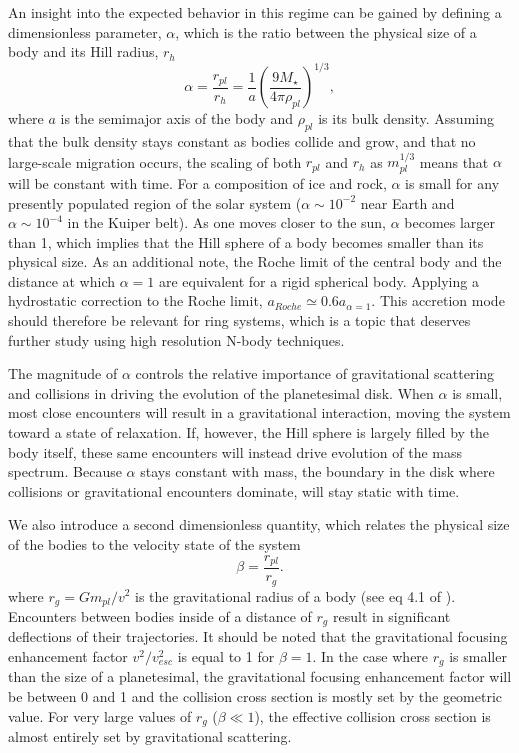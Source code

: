 An insight into the expected behavior in this regime can be gained by
defining a dimensionless parameter, $\alpha$, which is the ratio
between the physical size of a body and its Hill radius, $r_{h}$
\begin{equation}\label{eq:alpha}
	\alpha = \frac{r_{pl}}{r_{h}} = \frac{1}{a} \left( \frac{9 M_{\star}}{4 \pi \rho_{pl}} \right)^{1/3},
\end{equation}
where $a$ is the semimajor axis of the body and $\rho_{pl}$ is its
bulk density. Assuming that the bulk density stays constant as bodies collide and
grow, and that no large-scale migration occurs, the scaling of both
$r_{pl}$ and $r_{h}$ as $m_{pl}^{1/3}$ means that $\alpha$ will be
constant with time. For a composition of ice and rock, $\alpha$ is
small for any presently populated region of the solar system ($\alpha \sim
10^{-2}$ near Earth and $\alpha \sim 10^{-4}$ in the Kuiper belt). As
one moves closer to the sun, $\alpha$ becomes larger than 1, which
implies that the Hill sphere of a body becomes smaller than its physical size.
As an additional note, the Roche limit of the central body and the distance at which $\alpha = 1$ are equivalent for a rigid spherical body. Applying a hydrostatic correction to the Roche limit, $a_{Roche} \simeq 0.6 a_{\alpha = 1}$. This accretion mode should therefore be relevant for ring systems, which is a topic that deserves further study using high resolution N-body techniques.

The magnitude of $\alpha$ controls the relative importance of gravitational scattering and collisions in driving the evolution of the planetesimal disk. When $\alpha$ is small, most close encounters will result in a gravitational interaction, moving the system toward a state of relaxation. If, however, the Hill sphere is largely filled by the body itself, these same encounters will instead drive evolution of the mass spectrum. Because $\alpha$ stays constant with mass, the boundary in the disk where collisions or gravitational encounters dominate, will stay static with time.

We also introduce a second dimensionless quantity, which relates the physical size of the bodies to the velocity state of the system
\begin{equation}\label{eq:beta}
	\beta = \frac{r_{pl}}{r_{g}}.
\end{equation}
where $r_{g} = G m_{pl} / v^{2}$ is the gravitational radius of a body (see eq 4.1 of \cite{ida90}). Encounters between bodies inside of a distance of $r_{g}$ result in significant deflections of their trajectories. It should be noted that the gravitational focusing enhancement factor $v^{2}/v_{esc}^{2}$ is equal to 1 for $\beta = 1$. In the case where $r_{g}$ is smaller than the size of a planetesimal, the gravitational focusing enhancement factor will be between 0 and 1 and the collision cross section is mostly set by the geometric value. For very large values of $r_{g}$ ($\beta \ll 1$), the effective collision cross section is almost entirely set by gravitational scattering.

